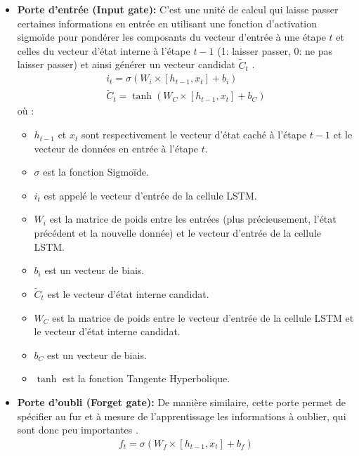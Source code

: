 \begin{itemize}
	\item \textbf{Porte d'entrée (Input gate): } C'est une unité de calcul qui laisse passer certaines informations en entrée en utilisant une fonction d'activation sigmoïde pour pondérer les composants du vecteur d'entrée à une étape $t$ et celles du vecteur d'état interne à l'étape $t-1$ (1: laisser passer, 0: ne pas laisser passer) et ainsi générer un vecteur candidat $\tilde{C}_t$ \citep{lstm_original_paper}.
	\begin{equation}
	\begin{gathered}
	i_t = \sigma(W_i \times [h_{t-1},x_t] + b_i) \\
	\tilde{C}_t = \tanh(W_C \times [h_{t-1},x_t] + b_C)
	\end{gathered}
	\end{equation}
	où : 
	\begin{itemize}
		\item $h_{t-1}$ et $x_t$ sont respectivement le vecteur d'état caché à l'étape $t-1$ et le vecteur de données en entrée à l'étape $t$.
		\item $\sigma$ est la fonction Sigmoïde. 
		\item $i_t$ est appelé le vecteur d'entrée de la cellule LSTM.
		\item $W_i$ est la matrice de poids entre les entrées (plus précieusement, l'état précédent et la nouvelle donnée) et le vecteur d'entrée de la cellule LSTM.
		\item $b_i$ est un vecteur de biais.
		\item $\tilde{C}_t$ est le vecteur d'état interne candidat. 
		\item $W_C$ est la matrice de poids entre le vecteur d'entrée de la cellule LSTM et le vecteur d'état interne candidat.
		\item $b_C$ est un vecteur de biais.
		\item $\tanh$ est la fonction Tangente Hyperbolique. 		
	\end{itemize}
	\item \textbf{Porte d'oubli (Forget gate): } De manière similaire, cette porte permet de spécifier au fur et à mesure de l'apprentissage les informations à oublier, qui sont donc peu importantes \citep{lstm_original_paper,rnn_lstms}.
	\newpage
	\begin{equation}
	\begin{gathered}
	f_t = \sigma(W_f \times [h_{t-1},x_t] + b_f)
	\end{gathered}
	\end{equation}
	

\end{itemize}
